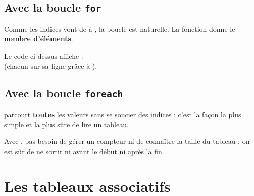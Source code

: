 \subsection{Avec la boucle \texttt{for}}

Comme les indices vont de  à , la boucle 
est naturelle. La fonction  donne le \textbf{nombre d'éléments}.


\begin{exemple}
Le code ci-dessus affiche :\\
\quad {}\quad {}\quad {}
(chacun sur sa ligne grâce à ).
\end{exemple}

\subsection{Avec la boucle \texttt{foreach}}

 parcourt \textbf{toutes} les valeurs sans se soucier des indices :
c'est la façon la plus simple et la plus sûre de lire un tableau.

\begin{syntaxe}
\end{syntaxe}


\begin{remarque}
Avec , pas besoin de gérer un compteur ni de connaître la taille du
tableau : on est sûr de ne sortir ni avant le début ni après la fin.
\end{remarque}

\section{Les tableaux associatifs}

